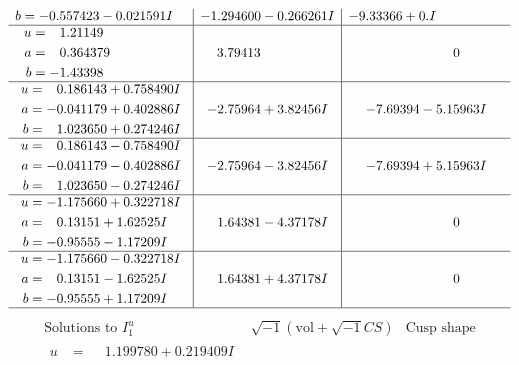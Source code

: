 \documentclass[1p]{elsarticle_modified}
\theoremstyle{definition}
\newcommand{\I}{\sqrt{-1}}
\begin{document}
$$\begin{array}{c|c|c}
\begin{aligned}
b &= -0.557423 - 0.021591 I\end{aligned}
 & -1.294600 - 0.266261 I & -9.33366 + 0. I\phantom{ +0.000000I} \\ \hline\begin{aligned}
u &= \phantom{-}1.21149\phantom{ +0.000000I} \\
a &= \phantom{-}0.364379\phantom{ +0.000000I} \\
b &= -1.43398\phantom{ +0.000000I}\end{aligned}
 & \phantom{-}3.79413\phantom{ +0.000000I} & \phantom{-0.000000 } 0 \\ \hline\begin{aligned}
u &= \phantom{-}0.186143 + 0.758490 I \\
a &= -0.041179 + 0.402886 I \\
b &= \phantom{-}1.023650 + 0.274246 I\end{aligned}
 & -2.75964 + 3.82456 I & -7.69394 - 5.15963 I \\ \hline\begin{aligned}
u &= \phantom{-}0.186143 - 0.758490 I \\
a &= -0.041179 - 0.402886 I \\
b &= \phantom{-}1.023650 - 0.274246 I\end{aligned}
 & -2.75964 - 3.82456 I & -7.69394 + 5.15963 I \\ \hline\begin{aligned}
u &= -1.175660 + 0.322718 I \\
a &= \phantom{-}0.13151 + 1.62525 I \\
b &= -0.95555 - 1.17209 I\end{aligned}
 & \phantom{-}1.64381 - 4.37178 I & \phantom{-0.000000 } 0 \\ \hline\begin{aligned}
u &= -1.175660 - 0.322718 I \\
a &= \phantom{-}0.13151 - 1.62525 I \\
b &= -0.95555 + 1.17209 I\end{aligned}
 & \phantom{-}1.64381 + 4.37178 I & \phantom{-0.000000 } 0\\
 \hline 
 \end{array}$$\newpage$$\begin{array}{c|c|c}  
\text{Solutions to }I^u_{1}& \I (\text{vol} + \sqrt{-1}CS) & \text{Cusp shape}\\
 \hline 
\begin{aligned}
u &= \phantom{-}1.199780 + 0.219409 I \\

\end{aligned}
\end{array}$$
\end{document}
